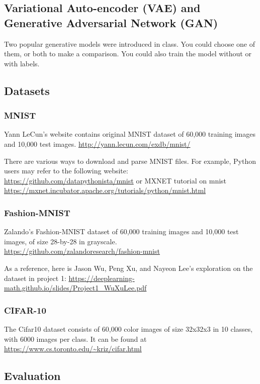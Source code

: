 \documentclass[11pt]{article}
\begin{document}
\subsection{Variational Auto-encoder (VAE) and Generative Adversarial Network (GAN)}\label{model}

Two popular generative models were introduced in class. You could choose one of them, or both to make a comparison. You could also train the model without or with labels.

\subsection{Datasets}\label{dataset}

\subsubsection{MNIST}

Yann LeCun's website contains original MNIST dataset of 60,000 training images and 10,000 test images. \url{http://yann.lecun.com/exdb/mnist/}

There are various ways to download and parse MNIST files. For example, Python users may refer to the following website: \url{https://github.com/datapythonista/mnist} or MXNET tutorial on mnist \url{https://mxnet.incubator.apache.org/tutorials/python/mnist.html}

\subsubsection{Fashion-MNIST}

Zalando's Fashion-MNIST dataset of 60,000 training images and 10,000 test images, of size 28-by-28 in grayscale. \url{https://github.com/zalandoresearch/fashion-mnist}

As a reference, here is Jason Wu, Peng Xu, and Nayeon Lee's exploration on the dataset in project 1: \url{https://deeplearning-math.github.io/slides/Project1_WuXuLee.pdf}

\subsubsection{CIFAR-10}

The Cifar10 dataset consists of 60,000 color images of size 32x32x3 in 10 classes, with 6000 images per class. It can be found at  \url{https://www.cs.toronto.edu/~kriz/cifar.html}

\subsection{Evaluation}\label{evaluation}
\end{document}
